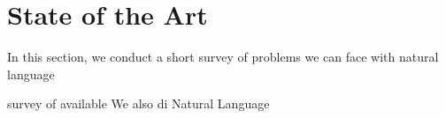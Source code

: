 \section{State of the Art}

In this section, we conduct a short survey of problems we can face with natural language

survey of available 
We also di
Natural Language

